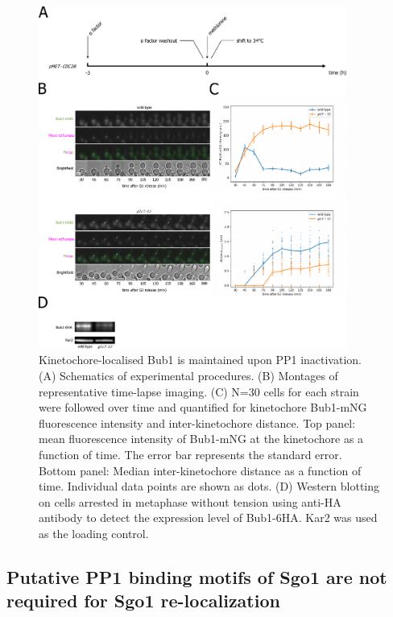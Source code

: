 \begin{figure}[htbp]
  \centering
  \includegraphics[width=0.9\textwidth]{chapter3/figures/Bub1 glc7-12.pdf}
  \caption[Kinetochore-localised Bub1 is maintained upon PP1 inactivation]{Kinetochore-localised Bub1 is maintained upon PP1 inactivation. (A) Schematics of experimental procedures. (B) Montages of representative time-lapse imaging. (C) N=30 cells for each strain were followed over time and quantified for kinetochore Bub1-mNG fluorescence intensity and inter-kinetochore distance. Top panel: mean fluorescence intensity of Bub1-mNG at the kinetochore as a function of time. The error bar represents the standard error. Bottom panel: Median inter-kinetochore distance as a function of time. Individual data points are shown as dots. (D) Western blotting on cells arrested in metaphase without tension using anti-HA antibody to detect the expression level of Bub1-6HA. Kar2 was used as the loading control.}
  \label{fig:bub1glc712}
\end{figure}

\subsection{Putative PP1 binding motifs of Sgo1 are not required for Sgo1 re-localization}

